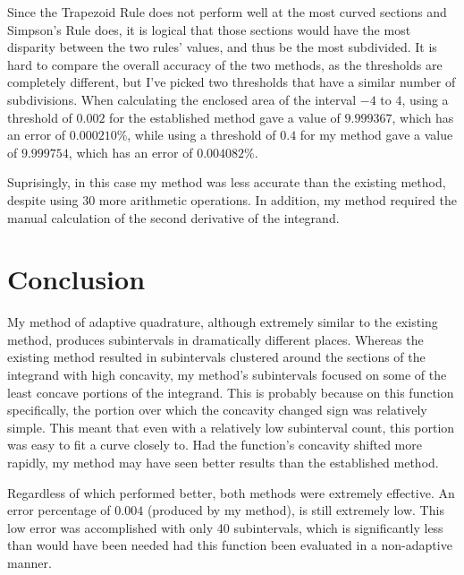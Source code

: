\documentclass{paper}
\begin{document}
Since the Trapezoid Rule does not perform well at the most curved sections and Simpson's Rule does, it is logical that those sections would have the most disparity between the two rules' values, and thus be the most subdivided.
It is hard to compare the overall accuracy of the two methods, as the thresholds are completely different, but I've picked two thresholds that have a similar number of subdivisions.
When calculating the enclosed area of the interval \(-4\) to \(4\), using a threshold of \(0.002\) for the established method gave a value of \(9.999367\), which has an error of \(0.000210\%\), while using a threshold of \(0.4\) for my method gave a value of \(9.999754\), which has an error of \(0.004082\%\).

Suprisingly, in this case my method was less accurate than the existing method, despite using 30 more arithmetic operations.
In addition, my method required the manual calculation of the second derivative of the integrand.

\section{Conclusion}
\label{sec:conclusion}
My method of adaptive quadrature, although extremely similar to the existing method, produces subintervals in dramatically different places.
Whereas the existing method resulted in subintervals clustered around the sections of the integrand with high concavity, my method's subintervals focused on some of the least concave portions of the integrand.
This is probably because on this function specifically, the portion over which the concavity changed sign was relatively simple.
This meant that even with a relatively low subinterval count, this portion was easy to fit a curve closely to.
Had the function's concavity shifted more rapidly, my method may have seen better results than the established method.

Regardless of which performed better, both methods were extremely effective. An error percentage of \(0.004\) (produced by my method), is still extremely low.
This low error was accomplished with only 40 subintervals, which is significantly less than would have been needed had this function been evaluated in a non-adaptive manner.

\label{mylastpage}
\newpage
\listoffigures
\vspace{1cm}
\listofsnippets
\vspace{1cm}
{}
\printbibliography
\thispagestyle{empty}
\end{document}

